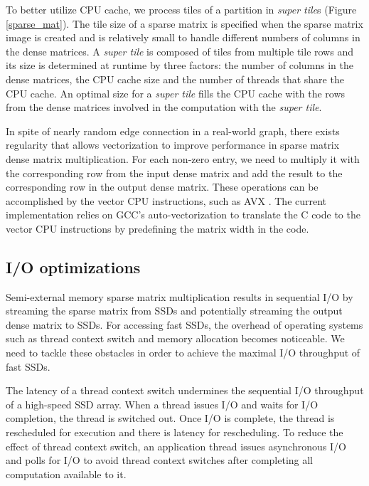 To better utilize CPU cache, we process tiles of a partition in
\textit{super tile}s (Figure \ref{sparse_mat}). The tile size of a sparse
matrix is specified when the sparse matrix image is created and is relatively
small to handle different numbers of columns in the dense matrices.
A \textit{super tile} is composed of tiles from multiple tile rows and its
size is determined at runtime by three factors: the number of columns
in the dense matrices, the CPU cache size and the number of threads that
share the CPU cache. An optimal size for a \textit{super tile} fills
the CPU cache with the rows from the dense matrices involved in
the computation with the \textit{super tile}.

In spite of nearly random edge connection in a real-world graph,
there exists regularity  that allows vectorization to improve performance
in sparse matrix dense matrix multiplication. For each non-zero entry, we
need to multiply it with the corresponding row from the input dense matrix
and add the result to the corresponding row in the output dense matrix.
These operations can be accomplished by the vector CPU instructions, such as
AVX \cite{avx}. The current implementation relies on GCC's auto-vectorization
to translate the C code to the vector CPU instructions by predefining the matrix
width in the code.

\subsection{I/O optimizations}
Semi-external memory sparse matrix multiplication results in sequential I/O
by streaming the sparse matrix from SSDs and potentially streaming the output
dense matrix to SSDs. For accessing fast SSDs, the overhead of operating systems
such as thread context switch and memory allocation becomes noticeable.
We need to tackle these obstacles in order to achieve the maximal I/O
throughput of fast SSDs.

The latency of a thread context switch undermines the sequential I/O throughput
of a high-speed SSD array.
When a thread issues I/O and waits for I/O completion, the thread is switched
out. Once I/O is complete, the thread is rescheduled for execution and there is
latency for rescheduling. To reduce the effect of thread context switch,
an application thread issues asynchronous I/O and polls for I/O to avoid thread
context switches after completing all computation available to it.

